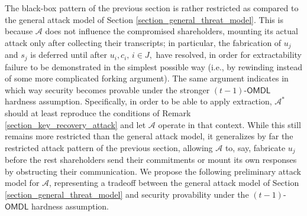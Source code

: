 \documentclass{iacrtrans}
\begin{document}
The black-box pattern of the previous section
is rather restricted as compared to
the general attack model of
Section \ref{section_general_threat_model}.
This is because $\mathcal{A}$ does
not influence the compromised shareholders,
mounting its actual attack only after collecting their
transcripts; in particular,
the fabrication of $u_j$ and $s_j$
is deferred until after $u_i, c_i,\hspace{2pt} i \in J,$
have resolved,
in order for extractability failure
to be demonstrated in the simplest possible way
(i.e., by rewinding instead of some more complicated forking argument).
The same argument
indicates in which way security becomes provable under
the stronger $(t-1)$-$\mathsf{OMDL}$ hardness assumption.
Specifically, in order to be able to apply extraction,
$\mathcal{A}^*$ should at least reproduce
the conditions of Remark \ref{section_key_recovery_attack}
and let $\mathcal{A}$ operate in that context.
While this still remains more restricted than the general attack model,
it generalizes by far the restricted attack pattern of
the previous section, allowing
$\mathcal{A}$ to, say, fabricate $u_j$ before the rest shareholders
send their commitments or mount its own responses
by obstructing their communication.
We propose the following preliminary attack model for $\mathcal{A}$,
representing a tradeoff between
the general attack model of Section \ref{section_general_threat_model}
and security provability
under the $(t-1)$-$\mathsf{OMDL}$ hardness assumption.
\end{document}
